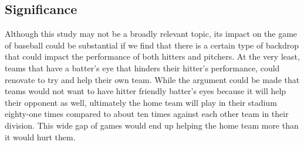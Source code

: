 \documentclass{article}
\begin{document}
\begin{doublespace}
\section{Significance}
Although this study may not be a broadly relevant topic, its impact on the game of baseball could be substantial if we find that there is a certain type of backdrop that could impact the performance of both hitters and pitchers. At the very least, teams that have a batter’s eye that hinders their hitter’s performance, could renovate to try and help their own team. While the argument could be made that teams would not want to have hitter friendly batter’s eyes because it will help their opponent as well, ultimately the home team will play in their stadium eighty-one times compared to about ten times against each other team in their division. This wide gap of games would end up helping the home team more than it would hurt them. 
\pagebreak

\end{doublespace}
\end{document}
